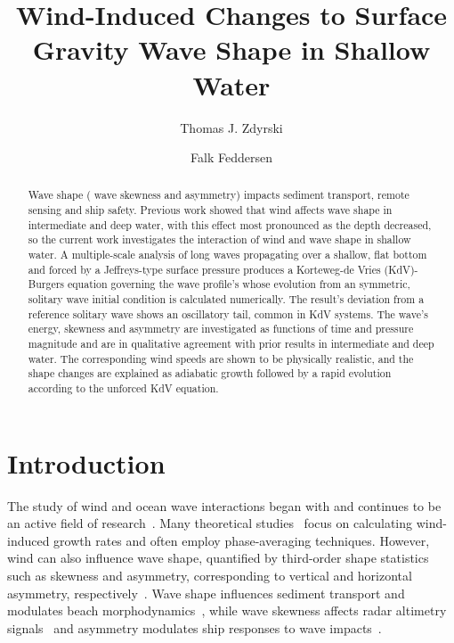 \documentclass{jfm}
\title{Wind-Induced Changes to Surface Gravity Wave Shape in Shallow Water}
\author{Thomas J. Zdyrski \and Falk Feddersen}
\begin{document}
\maketitle

\begin{abstract}
Wave shape (\eg{} wave skewness and asymmetry) impacts sediment
transport, remote sensing and ship safety.
Previous work showed that wind affects wave shape in intermediate and
deep water, with this effect most pronounced as the depth decreased, so
the current work investigates the interaction of wind and wave shape in
shallow water.
A multiple-scale analysis of long waves propagating over a shallow,
flat bottom and forced by a Jeffreys-type surface pressure produces a
Korteweg-de Vries (KdV)-Burgers equation governing the wave profile's
whose evolution from an symmetric, solitary wave initial condition is
calculated numerically.
The result's deviation from a reference solitary wave shows an
oscillatory tail, common in KdV systems.
The wave's energy, skewness and asymmetry are investigated as functions
of time and pressure magnitude and are in qualitative agreement with
prior results in intermediate and deep water.
The corresponding wind speeds are shown to be physically realistic, and
the shape changes are explained as adiabatic growth followed by a rapid
evolution according to the unforced KdV equation.
\end{abstract}

\section{Introduction}

The study of wind and ocean wave interactions began with
\citet{jeffreys1925formation} and continues to be an active field of
research~\citep[\eg][]{janssen1991quasi,donelan2006wave,sulivan2010dynamics}.
Many theoretical
studies~\citep[\eg][]{jeffreys1925formation,miles1957generation,phillips1957generation}
focus on calculating wind-induced growth rates and often employ
phase-averaging techniques.
However, wind can also influence wave shape, quantified by third-order
shape statistics such as skewness and asymmetry, corresponding to
vertical and horizontal asymmetry,
respectively~\citep[\eg][]{leykin1995asymmetry,feddersen2005wind,zdyrski2020wind}.
Wave shape influences sediment transport and modulates beach
morphodynamics~\citep[\eg][]{drake2001discrete,hoefel2003wave}, while
wave skewness affects radar altimetry
signals~\citep[\eg][]{hayne1980radar} and asymmetry modulates ship
responses to wave impacts~\citep[\eg][]{soares2008abnormal}.
\end{document}
